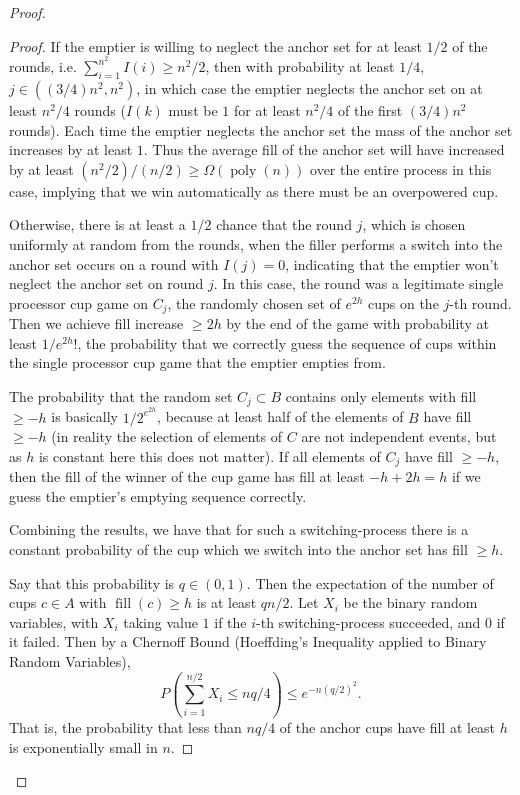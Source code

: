 \documentclass[twocolumn]{article}[10pt]
\DeclareMathOperator{\poly}{\text{poly}}
\DeclareMathOperator{\fil}{\text{fill}}
\begin{document}
\begin{proof}
\begin{proof}
  If the emptier is willing to neglect the anchor set for at least $1/2$ of the
  rounds, i.e. $\sum_{i=1}^{n^2} I(i) \ge n^2 / 2$, then with probability at
  least $1/4$, $j \in ((3/4) n^2, n^2)$, in which case the emptier neglects the anchor set
  on at least $n^2/4$ rounds ($I(k)$ must be $1$ for at least $n^2/4$ of the
  first $(3/4)n^2$ rounds). Each time the emptier neglects the anchor set the
  mass of the anchor set increases by at least $1$. Thus the average fill of the anchor
  set will have increased by at least $(n^2/2)/(n/2) \ge \Omega(\poly(n))$ over the
  entire process in this case, implying that we  win automatically as there
  must be an overpowered cup. 

  Otherwise, there is at least a $1/2$ chance that the round $j$, which is
  chosen uniformly at random from the rounds, when the filler performs a switch
  into the anchor set occurs on a round with $I(j)=0$, indicating that the emptier
  won't neglect the anchor set on round $j$. In this case, the round was a
  legitimate single processor cup game on $C_j$, the randomly chosen set of
  $e^{2h}$ cups on the $j$-th round. Then we achieve fill increase $\ge 2h$ by the
  end of the game with probability at least $1/e^{2h}!$, the probability that we
  correctly guess the sequence of cups within the single processor cup game
  that the emptier empties from. 

  The probability that the random set $C_j \subset B$ contains only elements
  with fill $\ge -h$ is basically $1/2^{e^{2h}}$, because at least half of the
  elements of $B$ have fill $\ge -h$ ({\color{red}in reality the selection of
    elements of $C$ are not independent events, but as $h$ is constant here this
  does not matter}). If all elements of $C_j$ have fill $\ge -h$, then the fill
  of the winner of the cup game has fill at least $-h + 2h = h$ if we guess the
  emptier's emptying sequence correctly.

  Combining the results, we have that for such a switching-process there is a
  constant probability of the cup which we switch into the anchor set has fill
  $\ge h$. 

  Say that this probability is $q \in (0,1)$. Then the expectation of the
  number of cups $c \in A$ with $\fil(c) \ge h$ is at least $qn/2$. Let $X_i$
  be the binary random variables, with $X_i$ taking value $1$ if the $i$-th
  switching-process succeeded, and $0$ if it failed. Then by a Chernoff Bound
  (Hoeffding's Inequality applied to Binary Random Variables),
  $$P\left(\sum_{i=1}^{n/2} X_i\le nq/4\right) \le e^{-n(q/2)^2}.$$ 
  That is, the probability that less than $nq/4$ of the anchor cups have fill
  at least $h$ is exponentially small in $n$.


\end{proof}
\end{proof}
\end{document}
